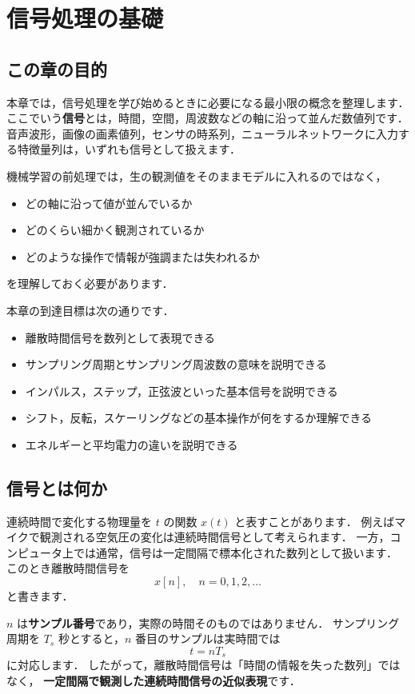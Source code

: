 \chapter{信号処理の基礎}


\section{この章の目的}

本章では，信号処理を学び始めるときに必要になる最小限の概念を整理します．
ここでいう\textbf{信号}とは，時間，空間，周波数などの軸に沿って並んだ数値列です．
音声波形，画像の画素値列，センサの時系列，ニューラルネットワークに入力する特徴量列は，いずれも信号として扱えます．

機械学習の前処理では，生の観測値をそのままモデルに入れるのではなく，
\begin{itemize}
\item どの軸に沿って値が並んでいるか
\item どのくらい細かく観測されているか
\item どのような操作で情報が強調または失われるか
\end{itemize}
を理解しておく必要があります．

本章の到達目標は次の通りです．
\begin{itemize}
\item 離散時間信号を数列として表現できる
\item サンプリング周期とサンプリング周波数の意味を説明できる
\item インパルス，ステップ，正弦波といった基本信号を説明できる
\item シフト，反転，スケーリングなどの基本操作が何をするか理解できる
\item エネルギーと平均電力の違いを説明できる
\end{itemize}


\section{信号とは何か}

連続時間で変化する物理量を $t$ の関数 $x(t)$ と表すことがあります．
例えばマイクで観測される空気圧の変化は連続時間信号として考えられます．
一方，コンピュータ上では通常，信号は一定間隔で標本化された数列として扱います．
このとき離散時間信号を
\[
x[n], \quad n = 0, 1, 2, \ldots
\]
と書きます．

$n$ は\textbf{サンプル番号}であり，実際の時間そのものではありません．
サンプリング周期を $T_s$ 秒とすると，$n$ 番目のサンプルは実時間では
\[
t = nT_s
\]
に対応します．
したがって，離散時間信号は「時間の情報を失った数列」ではなく，
\textbf{一定間隔で観測した連続時間信号の近似表現}です．


